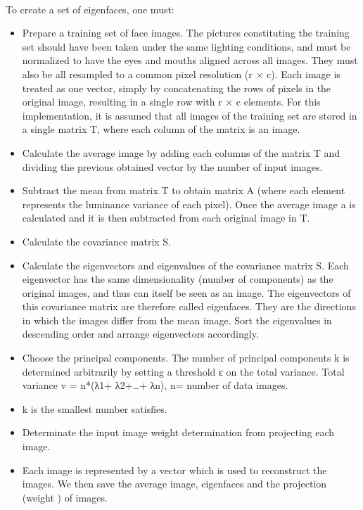 \paragraph{}
To create a set of eigenfaces, one must:
\begin{itemize}
\item Prepare a training set of face images. The pictures constituting the training set should have been taken under the same lighting conditions, and must be normalized to have the eyes and mouths aligned across all images. They must also be all resampled to a common pixel resolution (r × c). Each image is treated as one vector, simply by concatenating the rows of pixels in the original image, resulting in a single row with r × c elements. For this implementation, it is assumed that all images of the training set are stored in a single matrix T,  where each column of the matrix is an image.
\item Calculate the average image by adding each columns of the matrix T and dividing the previous obtained vector by the number of input images.
\item Subtract the mean from matrix T to obtain matrix A (where each element represents the luminance variance of each pixel). Once the average image a is calculated and it is then subtracted from each original image in T.
\item Calculate the covariance matrix S.
\item Calculate the eigenvectors and eigenvalues of the covariance matrix S. Each eigenvector has the same dimensionality (number of components) as the original images, and thus can itself be seen as an image. The eigenvectors of this covariance matrix are therefore called eigenfaces. They are the directions in which the images differ from the mean image. Sort the eigenvalues in descending order and arrange eigenvectors accordingly.
\item Choose the principal components. The number of principal components k is determined arbitrarily by setting a threshold ε on the total variance.
Total variance v = n*(λ1+ λ2+…+ λn), n= number of data images.
\item k is the smallest number satisfies.
\item Determinate the input image weight determination from projecting each image.
\item Each image is represented by a vector which is used to reconstruct the images. We then save the average image, eigenfaces and the projection (weight ) of images.
\end{itemize}


